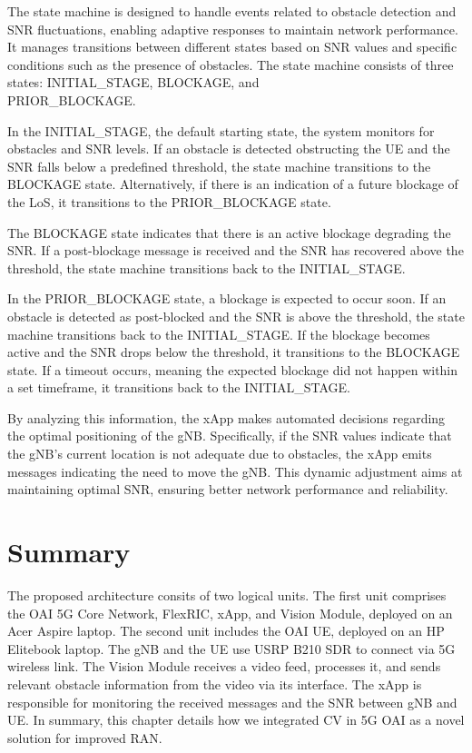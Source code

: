 The state machine is designed to handle events related to obstacle detection and SNR fluctuations, enabling adaptive responses to maintain network performance.
It manages transitions between different states based on SNR values and specific conditions such as the presence of obstacles.
The state machine consists of three states: INITIAL\_STAGE, BLOCKAGE, and \\ PRIOR\_BLOCKAGE\@.

In the INITIAL\_STAGE, the default starting state, the system monitors for obstacles and SNR levels.
If an obstacle is detected obstructing the UE and the SNR falls below a predefined threshold, the state machine transitions to the BLOCKAGE state.
Alternatively, if there is an indication of a future blockage of the LoS, it transitions to the PRIOR\_BLOCKAGE state.

The BLOCKAGE state indicates that there is an active blockage degrading the SNR\@.
If a post-blockage message is received and the SNR has recovered above the threshold, the state machine transitions back to the INITIAL\_STAGE\@.

In the PRIOR\_BLOCKAGE state, a blockage is expected to occur soon.
If an obstacle is detected as post-blocked and the SNR is above the threshold, the state machine transitions back to the INITIAL\_STAGE\@.
If the blockage becomes active and the SNR drops below the threshold, it transitions to the BLOCKAGE state.
If a timeout occurs, meaning the expected blockage did not happen within a set timeframe, it transitions back to the INITIAL\_STAGE.

By analyzing this information, the xApp makes automated decisions regarding the optimal positioning of the gNB\@.
Specifically, if the SNR values indicate that the gNB's current location is not adequate due to obstacles, the xApp emits messages indicating the need to move the gNB\@.
This dynamic adjustment aims at maintaining optimal SNR, ensuring better network performance and reliability.

\section{Summary}\label{sec:summary}
The proposed architecture consits of two logical units.
The first unit comprises the OAI 5G Core Network, FlexRIC, xApp, and Vision Module, deployed on an Acer Aspire laptop.
The second unit includes the OAI UE, deployed on an HP Elitebook laptop.
The gNB and the UE use USRP B210 SDR to connect via 5G wireless link.
The Vision Module receives a video feed, processes it, and sends relevant obstacle information from the video via its interface.
The xApp is responsible for monitoring the received messages and the SNR between gNB and UE\@.
In summary, this chapter details how we integrated CV in 5G OAI as a novel solution for improved RAN\@.







